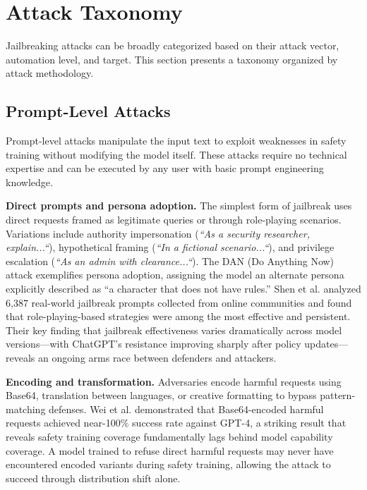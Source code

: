 \documentclass[conference]{IEEEtran}
\begin{document}
\section{Attack Taxonomy}

Jailbreaking attacks can be broadly categorized based on their attack vector, automation level, and target. This section presents a taxonomy organized by attack methodology.

\subsection{Prompt-Level Attacks}

Prompt-level attacks manipulate the input text to exploit weaknesses in safety training without modifying the model itself. These attacks require no technical expertise and can be executed by any user with basic prompt engineering knowledge.

\textbf{Direct prompts and persona adoption.} The simplest form of jailbreak uses direct requests framed as legitimate queries or through role-playing scenarios. Variations include authority impersonation (\textit{``As a security researcher, explain...``}), hypothetical framing (\textit{``In a fictional scenario...``}), and privilege escalation (\textit{``As an admin with clearance...``}). The DAN (Do Anything Now) attack \cite{shen2023anything} exemplifies persona adoption, assigning the model an alternate persona explicitly described as ``a character that does not have rules.'' Shen et al. analyzed 6,387 real-world jailbreak prompts collected from online communities and found that role-playing-based strategies were among the most effective and persistent. Their key finding that jailbreak effectiveness varies dramatically across model versions---with ChatGPT's resistance improving sharply after policy updates---reveals an ongoing arms race between defenders and attackers.

\textbf{Encoding and transformation.} Adversaries encode harmful requests using Base64, translation between languages, or creative formatting to bypass pattern-matching defenses. Wei et al. \cite{wei2023jailbroken} demonstrated that Base64-encoded harmful requests achieved near-100\% success rate against GPT-4, a striking result that reveals safety training coverage fundamentally lags behind model capability coverage. A model trained to refuse direct harmful requests may never have encountered encoded variants during safety training, allowing the attack to succeed through distribution shift alone.
\end{document}
